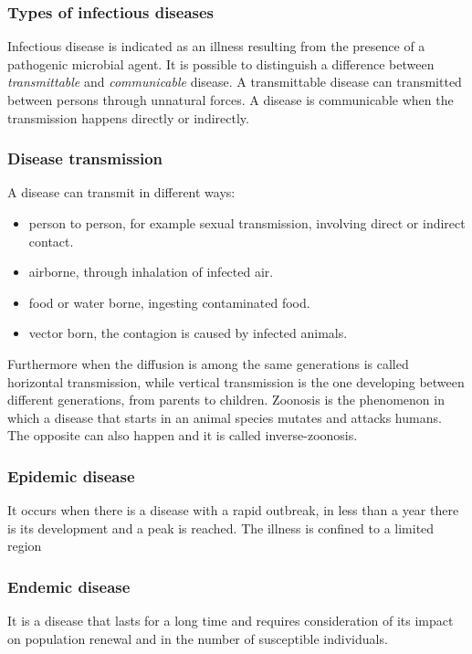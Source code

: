 \subsubsection{Types of infectious diseases}
Infectious disease is indicated as an illness resulting from the presence of a pathogenic microbial agent. It is possible to distinguish a difference between \textit{transmittable} and \textit{communicable} disease. A transmittable disease can transmitted between persons through unnatural forces. A disease is communicable when the transmission happens directly or indirectly.

\subsubsection{Disease transmission} A disease can transmit in different ways: 
	\begin{itemize}
		\item person to person, for example sexual transmission, involving direct or indirect contact.
		\item airborne, through inhalation of infected air.
		\item food or water borne, ingesting contaminated food. 
		\item vector born, the contagion is caused by infected animals.
	\end{itemize}
	Furthermore when the diffusion is among the same generations is called horizontal transmission, while vertical transmission is the one developing between different generations, from parents to children. 
	Zoonosis is the phenomenon in which a disease that starts in an animal species mutates and attacks humans. The opposite can also happen and it is called inverse-zoonosis. 
	
\subsubsection{Epidemic disease} It occurs when there is a disease with a rapid outbreak, in less than a year there is its development and a peak is reached. The illness is confined to a limited region

\subsubsection{Endemic disease} It is a disease that lasts for a long time and requires consideration of its impact on population renewal and in the number of susceptible individuals.

